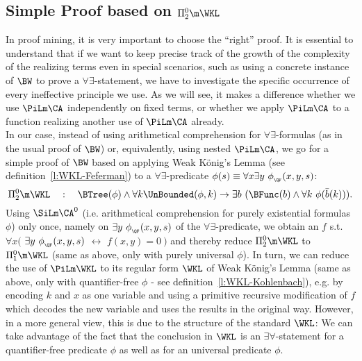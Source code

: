 \subsection{Simple Proof based on $\Pi^0_2\m\WKL$} \label{ss:spuWKL}
In proof mining, it is very important to choose the
``right'' proof. It is essential to understand that if
we want to keep precise track of the growth of the complexity of
the realizing terms even in special scenarios, such as using a concrete
instance of $\BW$ to prove a $\forall\exists$-statement, we have 
to investigate the specific occurrence of every ineffective principle we
use. As we will see, it makes a difference whether we use
$\PiLm\CA$ independently on fixed terms, or whether we
 apply $\PiLm\CA$ to a function realizing another
use of $\PiLm\CA$ already.\\
In our case, instead of using arithmetical comprehension
for $\forall\exists$-formulas (as in the usual proof of $\BW$) or, equivalently, 
using nested $\PiLm\CA$, we go for a simple proof of $\BW$ based on applying
Weak K\"onig's Lemma (see definition~\ref{l:WKL-Feferman}) 
to a $\forall\exists$-predicate $\phi(s)\equiv\forall x\exists  y\ \phi_{_\QF}(x, y, s)$:
\[
\Pi^0_2\m\WKL\quad:\quad
    \BTree(\phi) \wedge \forall k \UnBounded(\phi,k) 
        \rightarrow \exists b\ (\BFunc(b)\wedge\forall k\ \phi(\bar{b}(k)))\text{.}
\] 
Using $\SiLm\CA^0$ (i.e. arithmetical comprehension
for purely existential formulas $\phi$) only once, namely on $\exists y\ \phi_{_\QF}(x, y, s)$ of
the $\forall\exists$-predicate, we obtain an $f$ s.t. 
$\forall x($ $\exists  y\ \phi_{_\QF}(x, y, s)$ $\leftrightarrow$ $f(x,y)=0\ )$
and thereby reduce $\Pi^0_2\m\WKL$ to $\Pi^0_1\m\WKL$ (same as above, only with 
purely universal $\phi$).
In turn, we can reduce the use of $\PiLm\WKL$ to its regular
form $\WKL$ of Weak K\"onig's Lemma (same as above, 
only with quantifier-free $\phi$ - see definition~\ref{l:WKL-Kohlenbach}), 
e.g. by encoding $k$ and $x$ as one variable and using a primitive recursive modification
of $f$ which decodes the new variable and uses the results in the original way. 
However, in a more general view, this is due to the structure of the
standard $\WKL$:
We can take advantage of the fact that the conclusion in $\WKL$ is
an $\exists\forall$-statement for a quantifier-free predicate $\phi$ as well as for an
universal predicate $\phi$.
